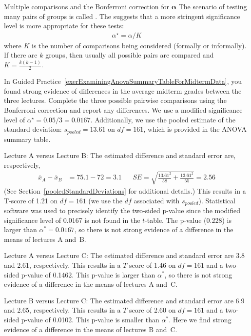 \begin{onebox}{Multiple comparisons and the Bonferroni
    correction for $\pmb{\alpha}$}
  The scenario of testing many pairs of groups is called
  .
  The  suggests that a more
  stringent significance level is more appropriate for
  these tests:
  \begin{align*}
  \alpha^{\star} = \alpha / K
  \end{align*}
  where $K$ is the number of comparisons being considered
  (formally or informally).
  If there are $k$ groups, then usually all possible pairs
  are compared and $K=\frac{k(k-1)}{2}$.
\end{onebox}

\begin{examplewrap}
\begin{nexample}{In Guided
    Practice~\ref{exerExaminingAnovaSummaryTableForMidtermData},
    you found strong evidence of differences in the average
    midterm grades between the three lectures.
    Complete the three possible pairwise comparisons using
    the Bonferroni correction and report any differences.}
  \label{multipleComparisonsOfThreeStatClasses}%
  We use a modified significance level of
  $\alpha^{\star} = 0.05 / 3 = 0.0167$.
  Additionally, we use the pooled estimate of the standard
  deviation:
  $s_{pooled}=13.61$ on $df=161$,
  which is provided in the ANOVA summary table.

  Lecture A versus Lecture B:
  The estimated difference and standard error are,
  respectively,
  \begin{align*}
  \bar{x}_A - \bar{x}_{B} &= 75.1 - 72 = 3.1
  &&SE = \sqrt{\frac{13.61^2}{58} + \frac{13.61^2}{55}} = 2.56
  \end{align*}
  (See Section~\vref{pooledStandardDeviations}
  for additional details.)
  This results in a T-score of 1.21 on $df = 161$
  (we use the $df$ associated with $s_{pooled}$).
  Statistical software was used to precisely identify the two-sided
  p-value since the modified significance level of 0.0167 is not
  found in the $t$-table.
  The p-value (0.228) is larger than $\alpha^*=0.0167$,
  so there is not strong evidence of a difference in the means
  of lectures A and~B.

  Lecture A versus Lecture C: The estimated difference and
  standard error are 3.8 and 2.61, respectively.
  This results in a $T$ score of 1.46 on $df = 161$
  and a two-sided p-value of 0.1462.
  This p-value is larger than $\alpha^*$, so there is not
  strong evidence of a difference in the means of lectures
  A and~C.

  Lecture B versus Lecture C: The estimated difference
  and standard error are 6.9 and 2.65, respectively.
  This results in a $T$ score of 2.60 on $df = 161$
  and a two-sided p-value of 0.0102.
  This p-value is smaller than $\alpha^*$.
  Here we find strong evidence of a difference in the
  means of lectures B and~C.
\end{nexample}
\end{examplewrap}

